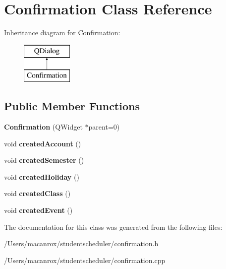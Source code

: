 \hypertarget{class_confirmation}{\section{Confirmation Class Reference}
\label{class_confirmation}
}
Inheritance diagram for Confirmation\-:\begin{figure}[H]
\begin{center}
\leavevmode
\includegraphics[height=2.000000cm]{class_confirmation}
\end{center}
\end{figure}
\subsection*{Public Member Functions}
\begin{DoxyCompactItemize}
\item 
\hypertarget{class_confirmation_a96bd3ae5935e5b5f00de22ff102d6458}{{\bfseries Confirmation} (Q\-Widget $\ast$parent=0)}\label{class_confirmation_a96bd3ae5935e5b5f00de22ff102d6458}

\item 
\hypertarget{class_confirmation_ab15191d758e5993be6ccf0ea751e00f6}{void {\bfseries created\-Account} ()}\label{class_confirmation_ab15191d758e5993be6ccf0ea751e00f6}

\item 
\hypertarget{class_confirmation_adec23882d8de468c7a27bec428ebd75e}{void {\bfseries created\-Semester} ()}\label{class_confirmation_adec23882d8de468c7a27bec428ebd75e}

\item 
\hypertarget{class_confirmation_a27774940db2a184a38cd931dd0e3af73}{void {\bfseries created\-Holiday} ()}\label{class_confirmation_a27774940db2a184a38cd931dd0e3af73}

\item 
\hypertarget{class_confirmation_aec0592bb428c30abf2b4b5dea7ebfc39}{void {\bfseries created\-Class} ()}\label{class_confirmation_aec0592bb428c30abf2b4b5dea7ebfc39}

\item 
\hypertarget{class_confirmation_af5ae70cdf537de5cb58f0caad4048c20}{void {\bfseries created\-Event} ()}\label{class_confirmation_af5ae70cdf537de5cb58f0caad4048c20}

\end{DoxyCompactItemize}


The documentation for this class was generated from the following files\-:\begin{DoxyCompactItemize}
\item 
/\-Users/macanrox/studentscheduler/confirmation.\-h\item 
/\-Users/macanrox/studentscheduler/confirmation.\-cpp\end{DoxyCompactItemize}
